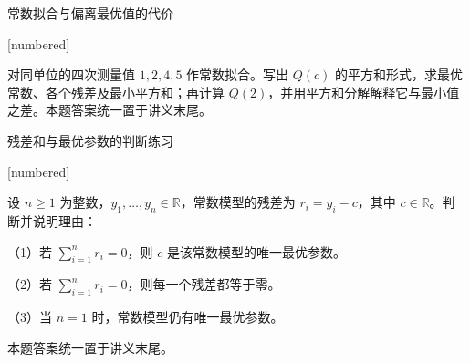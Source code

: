\documentclass[aspectratio=169,10pt,fontset=fandol]{ctexbeamer}
\makeatletter
\newcommand{\mathagentexerciselabelcontext}[1]{%
\hypertarget<1>{#1}{}%
\edef\@currentHref{#1}%
}
\makeatother
\begin{document}
\begin{frame}[t,fragile]{常数拟合与偏离最优值的代价}
\normalsize
{\normalsize
[numbered]
\mathagentexerciselabelcontext{mathagent.exercise.U0014.0}
\begin{exercise}
\label{mathagent:exercise:79e91357ee05b8b9aa4c657d553157f1ef411624d282c3f2337dd0e01453ce2d}
对同单位的四次测量值 $1,2,4,5$ 作常数拟合。写出 $Q(c)$ 的平方和形式，求最优常数、各个残差及最小平方和；再计算 $Q(2)$，并用平方和分解解释它与最小值之差。本题答案统一置于讲义末尾。
\end{exercise}
}
\end{frame}
\begin{frame}[t,fragile]{残差和与最优参数的判断练习}
\normalsize
{\normalsize
[numbered]
\mathagentexerciselabelcontext{mathagent.exercise.U0015.0}
\begin{exercise}
\label{mathagent:exercise:9e7dbf7ef17df1506f236bbf1ad6ff8c14ff13065df89e12b796d18475228be7}
设 $n\geq1$ 为整数，$y_1,\ldots,y_n\in\mathbb{R}$，常数模型的残差为 $r_i=y_i-c$，其中 $c\in\mathbb{R}$。判断并说明理由：

（1）若 $\sum_{i=1}^{n}r_i=0$，则 $c$ 是该常数模型的唯一最优参数。

（2）若 $\sum_{i=1}^{n}r_i=0$，则每一个残差都等于零。

（3）当 $n=1$ 时，常数模型仍有唯一最优参数。

本题答案统一置于讲义末尾。
\end{exercise}
}
\end{frame}
\end{document}

